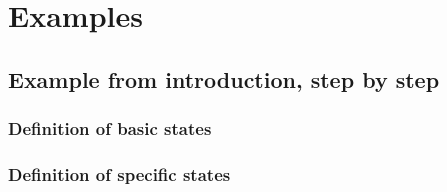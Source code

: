 \documentclass[a4paper,11pt]{report}
\newcommand{\inputTikZ}[1]{%
  }%
\newcommand{\inputTikZ}[1]{%
    \texttt{[image: fig/\#1.pdf]}%
  }%
\begin{document}
\section{Examples}

\subsection{Example from introduction, step by step}

\subsubsection{Definition of basic states}

\medskip

\begin{center}
\inputTikZ{statediagstep1}
\end{center}

\newpage

{\color{red!70!black}
\vspace{-0.37cm}
\vspace{-0.37cm}
\vspace{-0.37cm}
\vspace{-0.37cm}
\vspace{-0.37cm}

}

\vspace{-0.5cm}

\subsubsection{Definition of specific states}

\medskip

\begin{center}
\inputTikZ{statediagstep2}
\end{center}

\medskip
\end{document}
